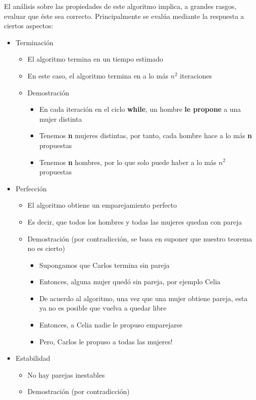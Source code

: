 \documentclass[letterpaper]{article}
\begin{document}
El análisis sobre las propiedades de este algoritmo implica, a grandes rasgos,
evaluar que éste sea correcto. Principalmente se evalúa mediante la respuesta
a ciertos aspectos:
\begin{itemize}
\item Terminación
\begin{itemize}
\item El algoritmo termina en un tiempo estimado
\item En este caso, el algoritmo termina en a lo más \(n^2\) iteraciones
\item Demostración
\begin{itemize}
\item En cada iteración en el ciclo \textbf{while}, un hombre \textbf{le propone} a una mujer
distinta
\item Tenemos \textbf{n} mujeres distintas, por tanto, cada hombre hace a lo más \textbf{n}
propuestas
\item Tenemos \textbf{n} hombres, por lo que solo puede haber a lo más \(n^2\) propuestas
\end{itemize}
\end{itemize}
\item Perfección
\begin{itemize}
\item El algoritmo obtiene un emparejamiento perfecto
\item Es decir, que todos los hombres y todas las mujeres quedan con pareja
\item Demostración (por contradicción, se basa en suponer que nuestro teorema no
es cierto)
\begin{itemize}
\item Supongamos que Carlos termina sin pareja
\item Entonces, alguna mujer quedó sin pareja, por ejemplo Celia
\item De acuerdo al algoritmo, una vez que una mujer obtiene pareja, esta ya no
es posible que vuelva a quedar libre
\item Entonces, a Celia nadie le propuso emparejarse
\item Pero, Carlos le propuso a todas las mujeres!
\end{itemize}
\end{itemize}
\item Estabilidad
\begin{itemize}
\item No hay parejas inestables
\item Demostración (por contradicción)

\end{itemize}
\end{itemize}
\end{document}
